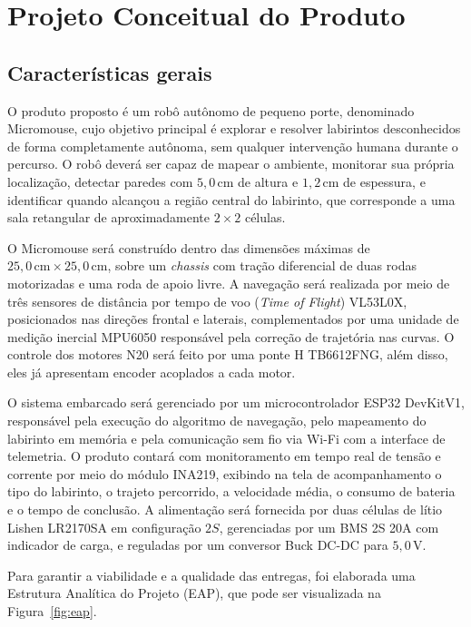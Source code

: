 
\chapter{Projeto Conceitual do Produto}

\section{Características gerais}

O produto proposto é um robô autônomo de pequeno porte, denominado Micromouse, cujo objetivo
principal é explorar e resolver labirintos desconhecidos de forma completamente autônoma, sem
qualquer intervenção humana durante o percurso. O robô deverá ser capaz de mapear o ambiente,
monitorar sua própria localização, detectar paredes com $5{,}0\,\text{cm}$ de altura e
$1{,}2\,\text{cm}$ de espessura, e identificar quando alcançou a região central do labirinto,
que corresponde a uma sala retangular de aproximadamente $2 \times 2$ células.

O Micromouse será construído dentro das dimensões máximas de
$25{,}0\,\text{cm} \times 25{,}0\,\text{cm}$, sobre um \textit{chassis} com tração diferencial
de duas rodas motorizadas e uma roda de apoio livre. A navegação será realizada por meio de
três sensores de distância por tempo de voo (\textit{Time of Flight}) VL53L0X, posicionados
nas direções frontal e laterais, complementados por uma unidade de medição inercial MPU6050
responsável pela correção de trajetória nas curvas. O controle dos motores N20 será feito por
uma ponte H TB6612FNG, além disso, eles já apresentam encoder acoplados a cada motor.

O sistema embarcado será gerenciado por um microcontrolador ESP32 DevKitV1, responsável pela
execução do algoritmo de navegação, pelo mapeamento do labirinto em memória e pela comunicação
sem fio via Wi-Fi com a interface de telemetria. O produto contará com monitoramento em tempo
real de tensão e corrente por meio do módulo INA219, exibindo na tela de acompanhamento o tipo
do labirinto, o trajeto percorrido, a velocidade média, o consumo de bateria e o tempo de
conclusão. A alimentação será fornecida por duas células de lítio Lishen LR2170SA em
configuração $2S$, gerenciadas por um BMS 2S 20A com indicador de carga, e reguladas por um
conversor Buck DC-DC para $5{,}0\,\text{V}$.

Para garantir a viabilidade e a qualidade das entregas, foi elaborada uma Estrutura Analítica
do Projeto (EAP), que pode ser visualizada na Figura~\ref{fig:eap}.

